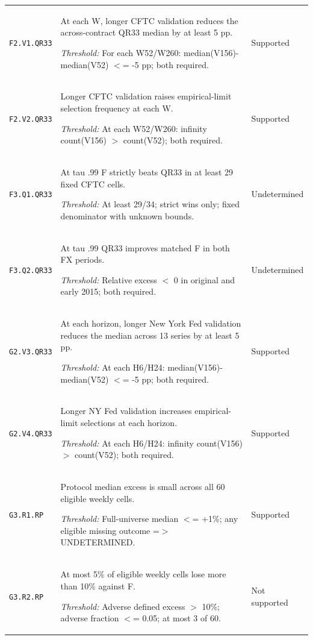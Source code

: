 \documentclass[10pt,a4paper]{article}
\begin{document}
{\begin{longtable}{p{2.0cm}p{10.5cm}p{2.5cm}}
\texttt{F2.\allowbreak{}V1.\allowbreak{}QR33} & At each W, longer CFTC validation reduces the across-contract QR33 median by at least 5 pp.\par\emph{Threshold:} For each W52/\allowbreak{}W260: median(V156)-median(V52) \ensuremath{<}=\allowbreak{} -5 pp; both required. & Supported \\[3pt]
\texttt{F2.\allowbreak{}V2.\allowbreak{}QR33} & Longer CFTC validation raises empirical-limit selection frequency at each W.\par\emph{Threshold:} At each W52/\allowbreak{}W260: infinity count(V156) \ensuremath{>} count(V52); both required. & Supported \\[3pt]
\texttt{F3.\allowbreak{}Q1.\allowbreak{}QR33} & At tau .99 F strictly beats QR33 in at least 29 fixed CFTC cells.\par\emph{Threshold:} At least 29/\allowbreak{}34; strict wins only; fixed denominator with unknown bounds. & Undetermined \\[3pt]
\texttt{F3.\allowbreak{}Q2.\allowbreak{}QR33} & At tau .99 QR33 improves matched F in both FX periods.\par\emph{Threshold:} Relative excess \ensuremath{<} 0 in original and early 2015; both required. & Undetermined \\[3pt]
\texttt{G2.\allowbreak{}V3.\allowbreak{}QR33} & At each horizon, longer New York Fed validation reduces the median across 13 series by at least 5 pp.\par\emph{Threshold:} At each H6/\allowbreak{}H24: median(V156)-median(V52) \ensuremath{<}=\allowbreak{} -5 pp; both required. & Supported \\[3pt]
\texttt{G2.\allowbreak{}V4.\allowbreak{}QR33} & Longer NY Fed validation increases empirical-limit selections at each horizon.\par\emph{Threshold:} At each H6/\allowbreak{}H24: infinity count(V156) \ensuremath{>} count(V52); both required. & Supported \\[3pt]
\texttt{G3.\allowbreak{}R1.\allowbreak{}RP} & Protocol median excess is small across all 60 eligible weekly cells.\par\emph{Threshold:} Full-universe median \ensuremath{<}=\allowbreak{} +1\%; any eligible missing outcome =\allowbreak{}\ensuremath{>} UNDETERMINED. & Supported \\[3pt]
\texttt{G3.\allowbreak{}R2.\allowbreak{}RP} & At most 5\% of eligible weekly cells lose more than 10\% against F.\par\emph{Threshold:} Adverse defined excess \ensuremath{>} 10\%; adverse fraction \ensuremath{<}=\allowbreak{} 0.05; at most 3 of 60. & Not supported \\[3pt]

\end{longtable}}
\end{document}
